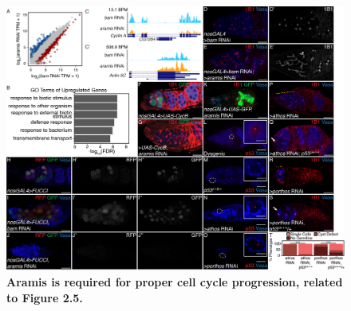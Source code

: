 \documentclass[12pt,oneside]{reedthesis}
\begin{document}
\begin{figure}

{\centering \includegraphics[width=7 in,height=5.409091 in]{./figure/Ribosome Biogenesis/Ribosome Biogenesis 3S} 

}

\caption[\textbf{Aramis is required for proper cell cycle progression, related to Figure 2.5.}]{\textbf{Aramis is required for proper cell cycle progression, related to Figure 2.5.}}\label{fig:unnamed-chunk-6}
\end{figure}
\end{document}
